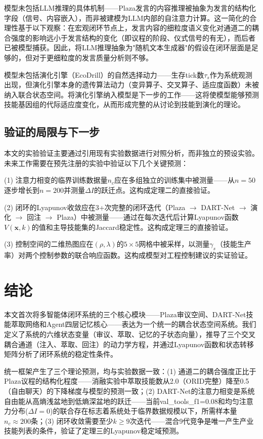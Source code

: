 \documentclass[twocolumn,10.5pt]{ctexart}
\begin{document}
模型未包括LLM推理的具体机制——Plaza发言的内容推理被抽象为发言的结构化字段（信号、内容嵌入），而非被建模为LLM内部的自注意力计算。这一简化的合理性基于以下观察：在宏观闭环节点上，发言内容的细粒度语义变化对通道二的耦合强度的影响远小于发言结构的变化（即议程的阶段、仪式信号的有无），而后者已被模型捕获。因此，将LLM推理抽象为"随机文本生成器"的假设在闭环层面是足够的，但对于更细粒度的发言质量分析则不够。

模型未包括演化引擎（EcoDrill）的自然选择动力——生存tick数$\tau_s$作为系统观测出现，但演化引擎本身的遗传算法动力（变异算子、交叉算子、适应度函数）未被纳入联合状态空间。将演化引擎纳入模型是下一步的工作——这将使模型能够预测技能基因组的代际适应度变化，从而形成完整的从讨论到技能到演化的理论。

\subsection{验证的局限与下一步}

本文的实验验证主要通过引用现有实验数据进行对照分析，而非独立的预设实验。未来工作需要在预先注册的实验中验证以下几个关键预测：

(1) 注意力相变的临界训练数据量$n_c$应在多组独立的训练集中被测量——从$n=50$逐步增长到$n=200$并测量$\Delta I$的跃迁点。这构成定理二的直接验证。

(2) 闭环的Lyapunov收敛应在3+次完整的闭环迭代（Plaza $\to$ DART-Net $\to$ 演化 $\to$ 回注 $\to$ Plaza）中被测量——通过在每次迭代后计算Lyapunov函数$V(\mathbf{x}, k)$的值和主导技能集的Jaccard稳定性。这构成定理三的直接验证。

(3) 控制空间的二维热图应在$(\rho, \lambda)$的$5\times5$网格中被采样，以测量$\gamma_s$（技能生产率）对两个控制参数的联合响应函数。这构成模型对工程控制建议的实证验证。

\section{结论}

本文首次将多智能体闭环系统的三个核心模块——Plaza审议空间、DART-Net技能萃取网络和Agent四层记忆核心——表达为一个统一的耦合状态空间系统。我们定义了系统的六维状态变量（审议、萃取、记忆的子状态向量），推导了三个交叉耦合通道（注入、萃取、回注）的动力学方程，并通过Lyapunov函数和状态转移矩阵分析了闭环系统的稳定性条件。

统一框架产生了三个理论预测，均与实验数据一致：(1) 通道二的耦合强度正比于Plaza议程的结构化程度——消融实验中萃取技能数从2.0（ORID完整）降至0.5（自由聊天）的下降梯度与模型的预测一致；(2) DART-Net的注意力相变是系统自由能从高熵浅盆地到低熵深盆地的跃迁——当前val\_tools\_f1=0.08和均匀注意力分布($\Delta I=0$)的联合存在标志着系统处于临界数据规模以下，所需样本量$n_c \approx 200$条；(3) 闭环收敛需要至少$k \geq 9$次迭代——混合9代竞争是唯一产生产业技能列表的条件，验证了定理三的Lyapunov稳定域预测。
\end{document}
